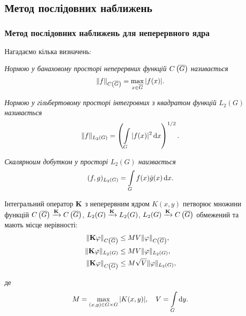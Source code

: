\subsection{Метод послідовних наближень}

\subsubsection{Метод послідовних наближень для неперервного ядра}

Нагадаємо кілька визначень:
\begin{definition}
	\it{Нормою} у банаховому просторі неперервних функцій $\CoG$ називається
	\begin{equation}
		\|f\|_{\CoG} = \Max_{x \in \oG} |f(x)|.
	\end{equation}
\end{definition}

\begin{definition}[норми у $L_2(G)$]
	\it{Нормою} у гільбертовому просторі інтегровних з квадратом функцій $L_2(G)$ називається
	\begin{equation}
		\|f\|_{L_2(G)} = \left( \Int_G |f(x)|^2 \diff x \right)^{1/2}.
	\end{equation}
\end{definition}

\begin{definition}
	\it{Скалярноим добутком} у просторі $L_2(G)$ наизвається
	\begin{equation}
		(f, g)_{L_2(G)} = \Int_G f(x) \bar g(x) \diff x.
	\end{equation}
\end{definition}

\begin{lemma} 
	\label{lemma:2.1.4}
	Інтегральний оператор $\bf{K}$ з неперервним ядром $K(x, y)$ петворює множини функцій $\CoG \xrightarrow{\bf{K}} \CoG$, $L_2(G) \xrightarrow{\bf{K}} L_2(G)$, $L_2(G) \xrightarrow{\bf{K}} \CoG$ обмежений та мають місце нерівності:
	\begin{align}
		\| \bf{K} \phi \|_{\CoG} &\le M V \| \phi \|_{\CoG}, \\
		\| \bf{K} \phi \|_{L_2(G)} &\le M V \| \phi \|_{L_2(G)}, \\
		\| \bf{K} \phi \|_{\CoG} &\le M \sqrt{V} \| \phi \|_{L_2(G)},
	\end{align}

	де
	\begin{equation}
		M = \Max_{(x, y) \in G \times G} |K(x, y)|, \quad V = \Int_G \diff y.
	\end{equation}
\end{lemma}

